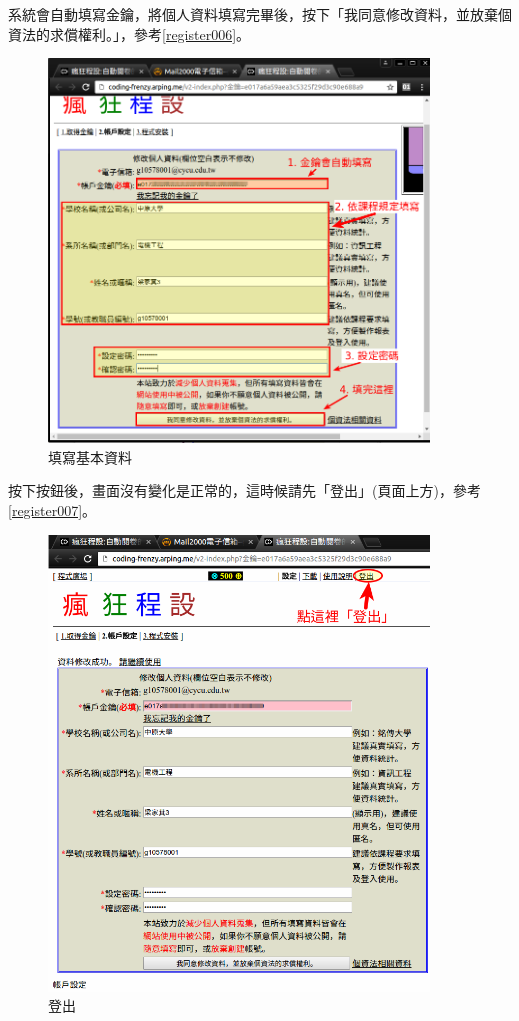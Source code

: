 \newpage
系統會自動填寫金鑰，將個人資料填寫完畢後，按下「我同意修改資料，並放棄個資法的求償權利。」，參考\autoref{register006}。

\begin{figure}[H]
	\centering
	\includegraphics[width=0.9\textwidth]{fig/install_and_setting/register_006}
	\caption{填寫基本資料}
	\label{register006}
\end{figure}

\newpage
按下按鈕後，畫面沒有變化是正常的，這時候請先「登出」(頁面上方)，參考\autoref{register007}。
\begin{figure}[H]
	\centering
	\includegraphics[width=0.9\textwidth]{fig/install_and_setting/register_007}
	\caption{登出}
	\label{register007}
\end{figure}

